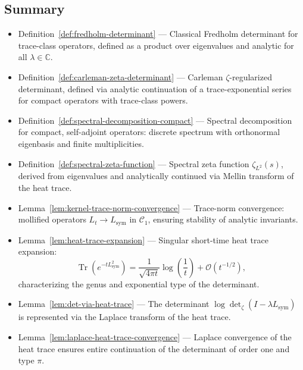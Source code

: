 \subsection*{Summary}

\begin{itemize}
  \item Definition~\ref{def:fredholm-determinant} — Classical Fredholm determinant for trace-class operators, defined as a product over eigenvalues and analytic for all \( \lambda \in \mathbb{C} \).

  \item Definition~\ref{def:carleman-zeta-determinant} — Carleman \(\zeta\)-regularized determinant, defined via analytic continuation of a trace-exponential series for compact operators with trace-class powers.

  \item Definition~\ref{def:spectral-decomposition-compact} — Spectral decomposition for compact, self-adjoint operators: discrete spectrum with orthonormal eigenbasis and finite multiplicities.

  \item Definition~\ref{def:spectral-zeta-function} — Spectral zeta function \( \zeta_{L^2}(s) \), derived from eigenvalues and analytically continued via Mellin transform of the heat trace.

  \item Lemma~\ref{lem:kernel-trace-norm-convergence} — Trace-norm convergence: mollified operators \( L_t \to L_{\mathrm{sym}} \) in \( \mathcal{C}_1 \), ensuring stability of analytic invariants.

  \item Lemma~\ref{lem:heat-trace-expansion} — Singular short-time heat trace expansion:
  \[
  \operatorname{Tr}(e^{-tL^2_{\mathrm{sym}}}) = \frac{1}{\sqrt{4\pi t}} \log\left(\frac{1}{t}\right) + \mathcal{O}(t^{-1/2}),
  \]
  characterizing the genus and exponential type of the determinant.

  \item Lemma~\ref{lem:det-via-heat-trace} — The determinant \( \log \det\nolimits_\zeta(I - \lambda L_{\mathrm{sym}}) \) is represented via the Laplace transform of the heat trace.

  \item Lemma~\ref{lem:laplace-heat-trace-convergence} — Laplace convergence of the heat trace ensures entire continuation of the determinant of order one and type \( \pi \).


\end{itemize}
